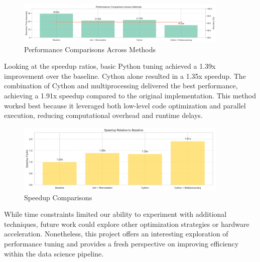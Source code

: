 \documentclass[11pt]{article}
\begin{document}
\begin{figure}[h]  
  \centering
  \includegraphics[width=0.9\textwidth]{performance_time.png} 
  \caption{Performance Comparisons Across Methods}
  \label{fig:myplot}
\end{figure}

Looking at the speedup ratios, basic Python tuning achieved a 1.39x improvement over the baseline. Cython alone resulted in a 1.35x speedup. The combination of Cython and multiprocessing delivered the best performance, achieving a 1.91x speedup compared to the original implementation. This method worked best because it leveraged both low-level code optimization and parallel execution, reducing computational overhead and runtime delays.

\begin{figure}[h]  
  \centering
  \includegraphics[width=0.9\textwidth]{speedup.png} 
  \caption{Speedup Comparisons}
  \label{fig:myplot}
\end{figure}

While time constraints limited our ability to experiment with additional techniques, future work could explore other optimization strategies or hardware acceleration. Nonetheless, this project offers an interesting exploration of performance tuning and provides a fresh perspective on improving efficiency within the data science pipeline.
\end{document}
